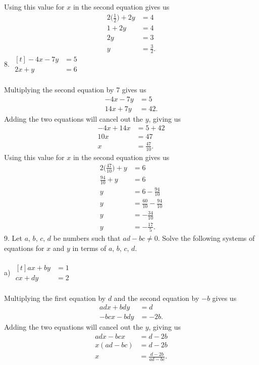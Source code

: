 \documentclass[12pt]{article}
\begin{document}
Using this value for $x$ in the second equation gives us
\begin{align*}
2\bigg(\frac{1}{2}\bigg)+2y&=4 \\
1+2y&=4 \\
2y&=3 \\
y&=\displaystyle \frac{3}{2}.
\end{align*}
8. $\begin{aligned}[t]
-4x-7y&=5 \\
2x+y&=6
\end{aligned}$ \\
\\
Multiplying the second equation by 7 gives us
\begin{align*}
-4x-7y&=5 \\
14x+7y&=42.
\end{align*}
Adding the two equations will cancel out the $y$, giving us
\begin{align*}
-4x+14x&=5+42 \\
10x&=47 \\
x&=\displaystyle \frac{47}{10}.
\end{align*}
Using this value for $x$ in the second equation gives us
\begin{align*}
2\bigg(\displaystyle \frac{47}{10}\bigg)+y&=6 \\
\displaystyle \frac{94}{10}+y&=6 \\
y&=6-\displaystyle \frac{94}{10} \\
y&=\displaystyle \frac{60}{10}-\displaystyle \frac{94}{10} \\
y&=-\displaystyle \frac{34}{10} \\
y&=-\displaystyle \frac{17}{5}.
\end{align*}
9. Let $a$, $b$, $c$, $d$ be numbers such that $ad-bc\neq0$. Solve the following systems of equations for $x$ and $y$ in terms of $a$, $b$, $c$, $d$. \\
\\
a) $\begin{aligned}[t]
ax+by&=1 \\
cx+dy&=2
\end{aligned}$ \\
\\
Multiplying the first equation by $d$ and the second equation by $-b$ gives us
\begin{align*}
adx+bdy&=d \\
-bcx-bdy&=-2b.
\end{align*}
Adding the two equations will cancel out the $y$, giving us
\begin{align*}
adx-bcx&=d-2b \\
x(ad-bc)&=d-2b \\
x&=\displaystyle \frac{d-2b}{ad-bc}.
\end{align*}
\end{document}
